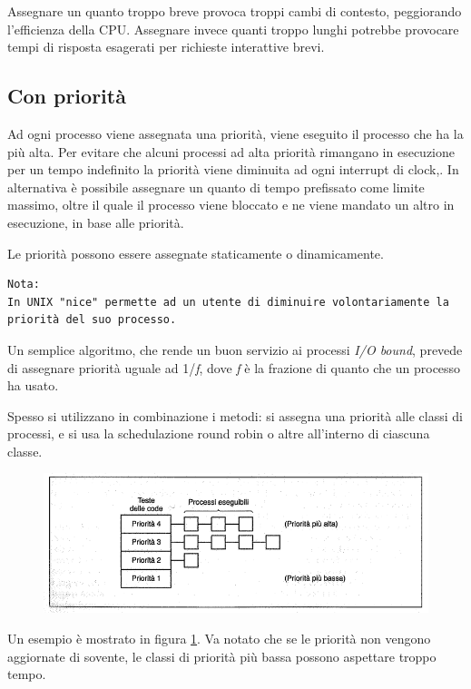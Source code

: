 Assegnare un quanto troppo breve provoca troppi cambi di contesto, peggiorando l'efficienza della CPU. Assegnare invece quanti troppo lunghi potrebbe provocare tempi di risposta esagerati per richieste interattive brevi.

\subsection{Con priorità}

Ad ogni processo viene assegnata una priorità, viene eseguito il processo che ha la più alta. Per evitare che alcuni processi ad alta priorità rimangano in esecuzione per un tempo indefinito la priorità viene diminuita ad ogni interrupt di clock,.
In alternativa è possibile assegnare un quanto di tempo prefissato come limite massimo, oltre il quale il processo viene bloccato e ne viene mandato un altro in esecuzione, in base alle priorità.

Le priorità possono essere assegnate staticamente o dinamicamente.

\begin{verbatim}
Nota: 
In UNIX "nice" permette ad un utente di diminuire volontariamente la priorità del suo processo.
\end{verbatim}

Un semplice algoritmo, che rende un buon servizio ai processi \textit{I/O bound}, prevede di assegnare priorità uguale ad 1/\textit{f}, dove \textit{f} è la frazione di quanto che un processo ha usato.

Spesso si utilizzano in combinazione i metodi: si assegna una priorità alle classi di processi, e si usa la schedulazione round robin o altre all'interno di ciascuna classe.

\begin{figure}[H]
    \centering
    \includegraphics[width=0.6\linewidth]{assets/priorita4.png}
    \caption{ }
    \label{priorita4}
\end{figure}


Un esempio è mostrato in figura \ref{priorita4}. Va notato che se le priorità non vengono aggiornate di sovente, le classi di priorità più bassa possono aspettare troppo tempo.

